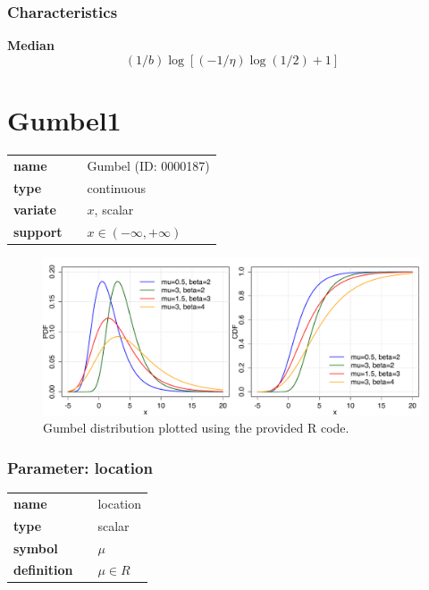 \subsubsection*{Characteristics}
\smallskip \noindent \hspace{.2cm} \textbf{Median} 
\begin{equation*}\left(1/b\right)\log\left[\left(-1/\eta\right) \log\left(1/2\right)+1\right]\end{equation*}
\smallskip
\section*{Gumbel1} 

  \bigskip 

\begin{tabular}{p{2cm}cl}
\textbf{name} & & Gumbel (ID: 0000187)\\ 
 
\textbf{type} & & continuous \\ 

\textbf{variate} & & $x$, scalar \\ 

\textbf{support} & & $x \in (-\infty,+\infty)$
\end{tabular}

\begin{figure}[ht!]
\centering
  \includegraphics[width=140mm]{pics/Gumbel.pdf}
 \caption{Gumbel distribution plotted using the provided R code.}
 \label{fig:Gumbel}
\end{figure}

\subsubsection*{Parameter: location}

\noindent\begin{tabular}{p{2cm}cl}
\textbf{name} & & location \\
\textbf{type} & & scalar \\
\textbf{symbol} & & $\mu$  \\
\textbf{definition} & & $\mu \in  R$
\end{tabular}
